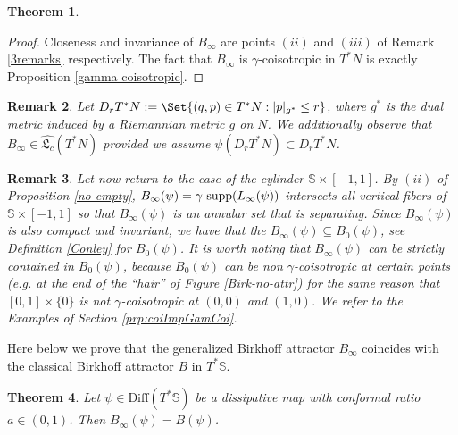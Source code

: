 \documentclass{article}
\newcommand{\1}{\mathbbm{1}}
\newtheorem{thm}{Theorem}[section]
\newtheorem{rem}[thm]{Remark}
\theoremstyle{remark}
\begin{document}
{{\begin{thm}
\end{thm}
\begin{proof}
Closeness and invariance of $B_{\infty}$ are points $(ii)$ and $(iii)$ of Remark \ref{3remarks} respectively. The fact that $B_{\infty}$ is $\gamma$-coisotropic in $T^*N$ is exactly Proposition \ref{gamma coisotropic}. 
\end{proof}
\begin{rem} \textnormal{Let $D_rT^*N := \Set{(q, p)\in T^*N: \vert p \vert_{g^*} \leq r}$, where $g^*$ is the dual metric induced by a Riemannian metric $g$ on $N$. We additionally observe that $B_{\infty} \in \widehat{\mathfrak{L}_c}(T^*N)$ provided we assume $\psi(D_rT^*N) \subset D_rT^*N$.}
\end{rem}
\begin{rem}\textnormal{
Let now return to the case of the cylinder $\mathbb{S} \times [-1,1]$. By $(ii)$ of Proposition \ref{no empty}, $B_{\infty}(\psi) = \gamma\textnormal{-supp}(L_{\infty}(\psi))$ intersects all vertical fibers of $\mathbb{S} \times [-1,1]$ so that $B_{\infty}(\psi)$ is an annular set that is separating. Since $B_{\infty}(\psi)$ is also compact and invariant, we have that the $B_{\infty}(\psi) \subseteq B_0(\psi)$, see Definition \ref{Conley} for $B_0(\psi)$. It is worth noting that $B_{\infty}(\psi)$ can be strictly contained in $B_0(\psi)$, because $B_0(\psi)$ can be non $\gamma$-coisotropic at certain points (e.g. at the end of the ``hair'' of Figure \ref{Birk-no-attr}) for the same reason that $[0,1] \times \{0\}$ is not $\gamma$-coisotropic at $(0,0)$ and $(1,0)$. We refer to the Examples of Section \ref{prp:coiImpGamCoi}}.
\end{rem}}}
Here below we prove that the generalized Birkhoff attractor $B_{\infty}$ coincides with the classical Birkhoff attractor $B$ in $T^*\mathbb{S}$.
\begin{thm} Let $\psi \in \mathrm{Diff}(T^*\mathbb{S})$ be a dissipative map with conformal ratio $a \in (0,1)$. Then $B_\infty(\psi) = B(\psi)$.
\end{thm}
\end{document}
